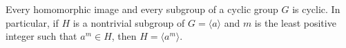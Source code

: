 \begin{theorem}
Every homomorphic image and every subgroup of a cyclic group $G$ is cyclic. In particular, if $H$ is a nontrivial subgroup of $G = \langle a \rangle$ and $m$ is the least positive integer such that $a^m \in H$, then $H = \langle a^m \rangle$.
\end{theorem}

